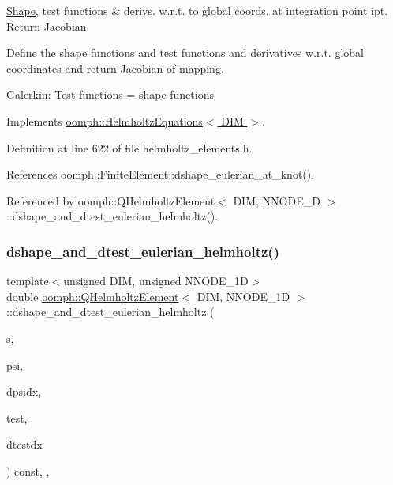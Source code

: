 \hyperlink{classoomph_1_1Shape}{Shape}, test functions \& derivs. w.\+r.\+t. to global coords. at integration point ipt. Return Jacobian. 

Define the shape functions and test functions and derivatives w.\+r.\+t. global coordinates and return Jacobian of mapping.

Galerkin\+: Test functions = shape functions 

Implements \hyperlink{classoomph_1_1HelmholtzEquations_a4559bf3e98ee0efa33f6efc11292ad3e}{oomph\+::\+Helmholtz\+Equations$<$ D\+I\+M $>$}.



Definition at line 622 of file helmholtz\+\_\+elements.\+h.



References oomph\+::\+Finite\+Element\+::dshape\+\_\+eulerian\+\_\+at\+\_\+knot().



Referenced by oomph\+::\+Q\+Helmholtz\+Element$<$ D\+I\+M, N\+N\+O\+D\+E\+\_\+D $>$\+::dshape\+\_\+and\+\_\+dtest\+\_\+eulerian\+\_\+helmholtz().

\mbox{\label{classoomph_1_1QHelmholtzElement_af7fc05bfa3f872b6d82596406faf2e26}} 
\subsubsection{\texorpdfstring{dshape\+\_\+and\+\_\+dtest\+\_\+eulerian\+\_\+helmholtz()}{dshape\_and\_dtest\_eulerian\_helmholtz()}}
{\footnotesize\ttfamily template$<$unsigned D\+IM, unsigned N\+N\+O\+D\+E\+\_\+1D$>$ \\
double \hyperlink{classoomph_1_1QHelmholtzElement}{oomph\+::\+Q\+Helmholtz\+Element}$<$ D\+IM, N\+N\+O\+D\+E\+\_\+1D $>$\+::dshape\+\_\+and\+\_\+dtest\+\_\+eulerian\+\_\+helmholtz (\begin{DoxyParamCaption}\item[{const \hyperlink{classoomph_1_1Vector}{Vector}$<$ double $>$ \&}]{s,  }\item[{\hyperlink{classoomph_1_1Shape}{Shape} \&}]{psi,  }\item[{\hyperlink{classoomph_1_1DShape}{D\+Shape} \&}]{dpsidx,  }\item[{\hyperlink{classoomph_1_1Shape}{Shape} \&}]{test,  }\item[{\hyperlink{classoomph_1_1DShape}{D\+Shape} \&}]{dtestdx }\end{DoxyParamCaption}) const\hspace{0.3cm}{\ttfamily [inline]}, {\ttfamily [protected]}, {\ttfamily [virtual]}}



